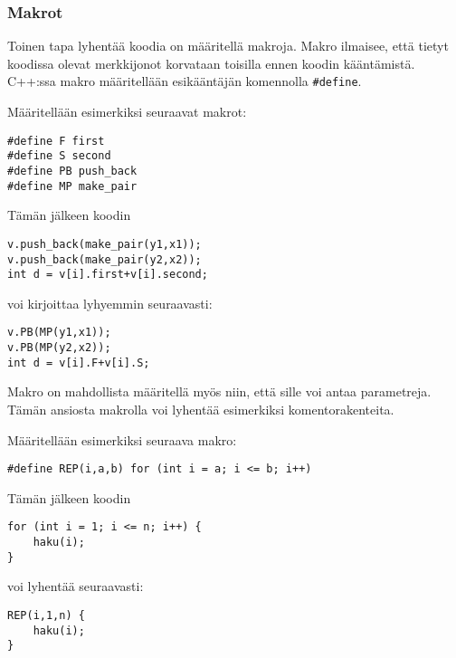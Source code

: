 \subsubsection{Makrot}

Toinen tapa lyhentää koodia on määritellä makroja.
Makro ilmaisee, että tietyt koodissa olevat
merkkijonot korvataan toisilla ennen koodin
kääntämistä.
C++:ssa makro määritellään
esikääntäjän komennolla \texttt{\#define}.

Määritellään esimerkiksi seuraavat makrot:
\begin{lstlisting}
#define F first
#define S second
#define PB push_back
#define MP make_pair
\end{lstlisting}
Tämän jälkeen koodin
\begin{lstlisting}
v.push_back(make_pair(y1,x1));
v.push_back(make_pair(y2,x2));
int d = v[i].first+v[i].second;
\end{lstlisting}
voi kirjoittaa lyhyemmin seuraavasti:
\begin{lstlisting}
v.PB(MP(y1,x1));
v.PB(MP(y2,x2));
int d = v[i].F+v[i].S;
\end{lstlisting}
Makro on mahdollista määritellä myös niin,
että sille voi antaa parametreja.
Tämän ansiosta makrolla voi lyhentää esimerkiksi
komentorakenteita.

Määritellään esimerkiksi seuraava makro:
\begin{lstlisting}
#define REP(i,a,b) for (int i = a; i <= b; i++)
\end{lstlisting}

Tämän jälkeen koodin
\begin{lstlisting}
for (int i = 1; i <= n; i++) {
    haku(i);
}
\end{lstlisting}
voi lyhentää seuraavasti:
\begin{lstlisting}
REP(i,1,n) {
    haku(i);
}
\end{lstlisting}

% 
% 
% 
% 

